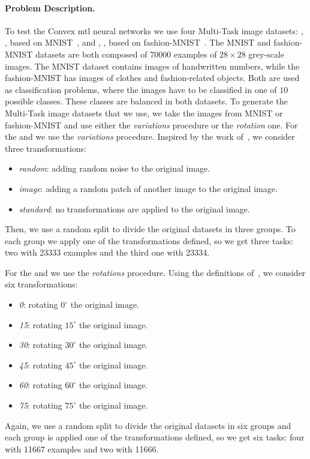 \paragraph*{Problem Description.\\}
To test the Convex \acrshort{mtl} neural networks we use four Multi-Task image datasets:
, , based on MNIST~\citep{LeCunBBH98}, and , , based on fashion-MNIST~\citep{xiao2017}.
%
The MNIST and fashion-MNIST datasets are both composed of \num{70000} examples of $28\times 28$ grey-scale images. The MNIST dataset contains images of handwritten numbers, while the fashion-MNIST has images of clothes and fashion-related objects.
Both are used as classification problems, where the images have to be classified in one of $10$ possible classes. These classes are balanced in both datasets.
%
To generate the Multi-Task image datasets that we use, we take the images from MNIST or fashion-MNIST and use either the \emph{variations} procedure or the \emph{rotation} one.
%
For the  and  we use the \emph{variations} procedure. Inspired by the work of~\cite{BergstraB12}, we consider three transformations:
\begin{itemize}
    \item \textit{random}: adding random noise to the original image.
    \item \textit{image}: adding a random patch of another image to the original image.
    \item \textit{standard}: no transformations are applied to the original image.
\end{itemize}
Then, we use a random split to divide the original datasets in three groups. To each group we apply one of the transformations defined, so we get three tasks: two with \num{23333} examples and the third one with \num{23334}.

%
For the  and  we use the \emph{rotations} procedure. Using the definitions of~\cite{GhifaryKZB15}, we consider six transformations:
\begin{itemize}
    \item \textit{0}: rotating $0^{\circ}$ the original image.
    \item \textit{15}: rotating $15^{\circ}$ the original image.
    \item \textit{30}: rotating $30^{\circ}$ the original image.
    \item \textit{45}: rotating $45^{\circ}$ the original image.
    \item \textit{60}: rotating $60^{\circ}$ the original image.
    \item \textit{75}: rotating $75^{\circ}$ the original image.
\end{itemize}
Again, we use a random split to divide the original datasets in six groups and each group is applied one of the transformations defined, so we get six tasks: four with \num{11667} examples and two with \num{11666}.
%

